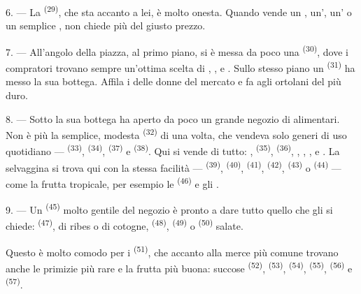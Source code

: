 \VUsaut{4.0mm}
\VUsaut{3.0mm}

6. --- La  \textsuperscript{(29)}, che sta accanto a lei, è molto
onesta. Quando vende un , un', un' o un
semplice , non chiede più del giusto prezzo.

7. --- All'angolo della piazza, al primo piano, si è messa da poco una
 \textsuperscript{(30)}, dove i compratori trovano
sempre un'ottima scelta di , ,
 e . Sullo stesso piano un
 \textsuperscript{(31)} ha messo la sua bottega. Affila i
 delle donne del mercato e fa agli ortolani 
del  più duro.

\VUsaut{4.0mm}
\VUsaut{3.0mm}

8. --- Sotto la sua bottega ha aperto da poco un grande negozio di alimentari. Non è
più la semplice, modesta  \textsuperscript{(32)} di una volta, che
vendeva solo generi di uso quotidiano ---  \textsuperscript{(33)},
 \textsuperscript{(34)}, 
\textsuperscript{(37)} e  \textsuperscript{(38)}. Qui si vende di tutto:
,  \textsuperscript{(35)},
 \textsuperscript{(36)}, , ,
,  e . La selvaggina si trova qui con
la stessa facilità ---  \textsuperscript{(39)}, 
\textsuperscript{(40)},  \textsuperscript{(41)}, 
\textsuperscript{(42)},  \textsuperscript{(43)} o
 \textsuperscript{(44)} --- come la frutta tropicale, per esempio le
 \textsuperscript{(46)} e gli .

9. --- Un  \textsuperscript{(45)} molto gentile del negozio è pronto a
dare tutto quello che gli si chiede:  \textsuperscript{(47)}, di
ribes o di cotogne,  \textsuperscript{(48)},
 \textsuperscript{(49)} o  \textsuperscript{(50)}
salate.

Questo è molto comodo per i  \textsuperscript{(51)}, che accanto alla
merce più comune trovano anche le primizie più rare e la frutta più buona: succose
 \textsuperscript{(52)},  \textsuperscript{(53)},
 \textsuperscript{(54)},  \textsuperscript{(55)},
 \textsuperscript{(56)} e  \textsuperscript{(57)}.

